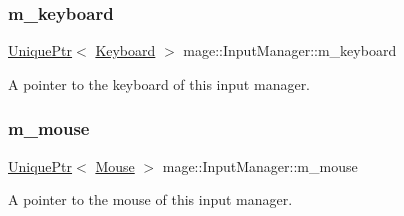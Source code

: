 \subsubsection{\texorpdfstring{m\+\_\+keyboard}{m\_keyboard}}
{\footnotesize\ttfamily \hyperlink{namespacemage_a8c307fbcc33bce9b7f2aa4c26c3b95cf}{Unique\+Ptr}$<$ \hyperlink{classmage_1_1_keyboard}{Keyboard} $>$ mage\+::\+Input\+Manager\+::m\+\_\+keyboard\hspace{0.3cm}{\ttfamily [private]}}

A pointer to the keyboard of this input manager. \hypertarget{classmage_1_1_input_manager_aab9773cccf9626a7e2acb99227b42e37}{}\label{classmage_1_1_input_manager_aab9773cccf9626a7e2acb99227b42e37} 
\subsubsection{\texorpdfstring{m\+\_\+mouse}{m\_mouse}}
{\footnotesize\ttfamily \hyperlink{namespacemage_a8c307fbcc33bce9b7f2aa4c26c3b95cf}{Unique\+Ptr}$<$ \hyperlink{classmage_1_1_mouse}{Mouse} $>$ mage\+::\+Input\+Manager\+::m\+\_\+mouse\hspace{0.3cm}{\ttfamily [private]}}

A pointer to the mouse of this input manager. 